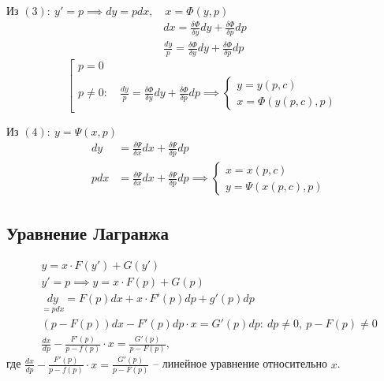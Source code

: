 \documentclass{report}
\theoremstyle{definition}
\begin{document}
Из $(3): \ y' = p \implies dy = pdx, \quad x = \Phi(y,p)$
\begin{eqnarray*}
    dx = \frac{\delta \Phi}{\delta y}dy + \frac{\delta \Phi}{\delta p}dp \\
    \frac{dy}{p} = \frac{\delta \Phi}{\delta y}dy + \frac{\delta \Phi}{\delta p}dp
\end{eqnarray*}
\begin{equation*}
    \left[\begin{array}{l}
        p = 0 \\
        p \ne 0: \quad \frac{dy}{p} = \frac{\delta \Phi}{\delta y}dy + \frac{\delta \Phi}{\delta p}dp \implies \left\{\begin{array}{l}
                                                                                                                          y = y(p,c) \\
                                                                                                                          x = \Phi (y(p,c),p)
                                                                                                                      \end{array}\right.
    \end{array}\right.
\end{equation*}

Из $(4): \ y = \Psi(x,p)$
\begin{eqnarray*}
    & dy & = \frac{\delta \Psi}{\delta x}dx + \frac{\delta \Psi}{\delta p}dp \\
    & pdx & = \frac{\delta \Psi}{\delta x}dx + \frac{\delta \Psi}{\delta p}dp \implies \left\{\begin{array}{l}
        x = x(p,c) \\
        y = \Psi(x(p,c),p)
    \end{array}\right.
\end{eqnarray*}

\subsection*{Уравнение Лагранжа}

\begin{eqnarray*}
    &y = x \cdot F(y') + G(y') \\
    &y' = p \implies y = x\cdot F(p) + G(p) \\
    &\underset{=pdx}{dy} = F(p)dx + x\cdot F'(p)dp + g'(p)dp \\
    &(p - F(p))dx - F'(p)dp \cdot x = G'(p)dp: \ dp \ne 0, \ p - F(p)\ne 0 \\
    &\frac{dx}{dp} - \frac{F'(p)}{p - f(p)}\cdot x = \frac{G'(p)}{p - F(p)},
\end{eqnarray*}
где $\frac{dx}{dp} - \frac{F'(p)}{p - f(p)}\cdot x = \frac{G'(p)}{p - F(p)}$ -- линейное уравнение относительно $x$.
\end{document}
